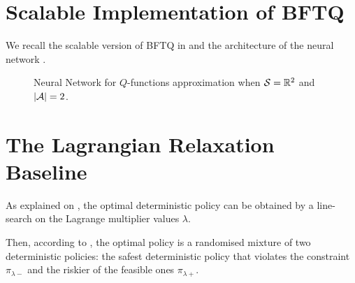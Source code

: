 
%

\section{Scalable Implementation of BFTQ}
\label{sec:bftq-full}

We recall the scalable version of BFTQ in  and the architecture of the neural network .

\begin{figure}[tp]
    \centering
    
    \caption{Neural Network for $Q$-functions approximation when $\mathcal{S}=\mathbb{R}^2$ and $|\mathcal{A}| = 2$.}
    \label{fig:architecture}
\end{figure}



\section{The Lagrangian Relaxation Baseline}
\label{sec:lagragian}
As explained on , the optimal deterministic policy can be obtained by a line-search on the Lagrange multiplier values $\lambda$.

Then, according to \citet[Theorem 4.4]{BEUTLER1985236}, the optimal policy is a randomised mixture of two deterministic policies: the safest deterministic policy that violates the constraint $\pi_{\lambda-}$ and the riskier of the feasible ones $\pi_{\lambda+}$.

